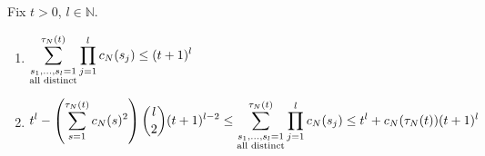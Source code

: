 \begin{lemma}\label{thm:sumprod1}
Fix $t>0$, $l\in\mathbb{N}$.
\begin{enumerate}[label=(\alph*)]
\item \label{thm:sumprod1_a} %
$\begin{aligned}
\sum_{\substack{ s_1, \dots, s_l =1 \\ \text{\normalfont{all distinct}} }}^{\tau_N(t)}
        \prod_{j=1}^l c_N(s_j)
    \leq (t+1)^l
\end{aligned}$
\item \label{thm:sumprod1_b} %
$\begin{aligned}
t^l - \left( \sum_{s=1}^{\tau_N(t)} c_N(s)^2 \right) \binom{l}{2} (t+1)^{l-2} 
    \leq \sum_{\substack{ s_1, \dots, s_l =1 \\ \text{\normalfont{all distinct}} }}
        ^{\tau_N(t)} \prod_{j=1}^l c_N(s_j)
    \leq t^l + c_N(\tau_N(t)) (t+1)^l
\end{aligned}$
\end{enumerate}
\end{lemma}

